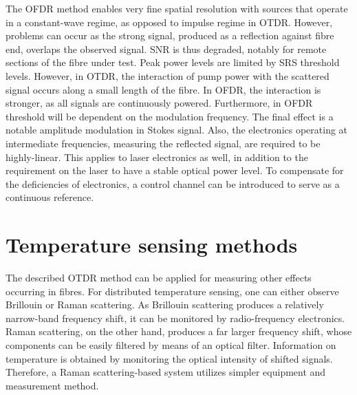 \documentclass{standalone}
\begin{document}
The OFDR method enables very fine spatial resolution with sources that operate in a constant-wave regime, as opposed to impulse regime in OTDR. However, problems can occur as the strong signal, produced as a reflection against fibre end, overlaps the observed signal. SNR is thus degraded, notably for remote sections of the fibre under test. Peak power levels are limited by SRS threshold levels. However, in OTDR, the interaction of pump power with the scattered signal occurs along a small length of the fibre. In OFDR, the interaction is stronger, as all signals are continuously powered. Furthermore, in OFDR threshold will be dependent on the modulation frequency. The final effect is a notable amplitude modulation in Stokes signal. Also, the electronics operating at intermediate frequencies, measuring the reflected signal, are required to be highly-linear. This applies to laser electronics as well, in addition to the requirement on the laser to have a stable optical power level. To compensate for the deficiencies of electronics, a control channel can be introduced to serve as a continuous reference.

\section{Temperature sensing methods}

The described OTDR method can be applied for measuring other effects occurring in fibres. For distributed temperature sensing, one can either observe Brillouin or Raman scattering. As Brillouin scattering produces a relatively narrow-band frequency shift, it can be monitored by radio-frequency electronics. Raman scattering, on the other hand, produces a far larger frequency shift, whose components can be easily filtered by means of an optical filter. Information on temperature is obtained by monitoring the optical intensity of shifted signals. Therefore, a Raman scattering-based system utilizes simpler equipment and measurement method. \\
\end{document}
